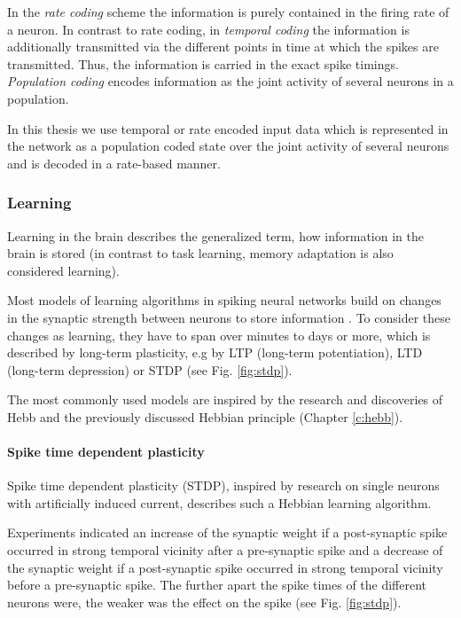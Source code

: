 In the \textit{rate coding} scheme the information is purely contained in the firing rate of a neuron.
In contrast to rate coding, in \textit{temporal coding} the information is additionally transmitted via the different points in time at which the spikes are transmitted. 
Thus, the information is carried in the exact spike timings.
\textit{Population coding} encodes information as the joint activity of several neurons in a population.  

In this thesis we use temporal or rate encoded input data which is represented in the network as a population coded state over the joint activity of several neurons and is decoded in a rate-based manner. 

\subsubsection{Learning} \label{c:snnlearning}

Learning in the brain describes the generalized term, how information in the brain is stored (in contrast to task learning, memory adaptation is also considered learning).

Most models of learning algorithms in spiking neural networks build on changes in the synaptic strength between neurons to store information \cite{gerstner2014neuronal}.
To consider these changes as learning, they have to span over minutes to days or more, which is described by long-term plasticity, e.g by LTP (long-term potentiation), LTD (long-term depression) or STDP (see Fig. \ref{fig:stdp}).
 
The most commonly used models are inspired by the research and discoveries of Hebb and the previously discussed Hebbian principle (Chapter \ref{c:hebb}).

\paragraph{Spike time dependent plasticity} \label{c:stdp}

Spike time dependent plasticity (STDP), inspired by research on single neurons with artificially induced current, describes such a Hebbian learning algorithm.

Experiments indicated an increase of the synaptic weight if a post-synaptic spike occurred in strong temporal vicinity after a pre-synaptic spike and a decrease of the synaptic weight if a post-synaptic spike occurred in strong temporal vicinity before a pre-synaptic spike.
The further apart the spike times of the different neurons were, the weaker was the effect on the spike (see Fig. \ref{fig:stdp}).

